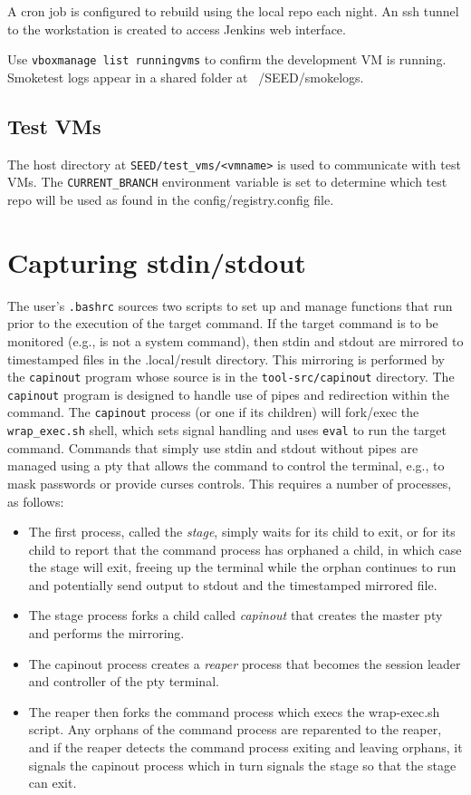 \documentclass[12pt]{article}
\begin{document}
A cron job is configured to rebuild using the local repo each night.
An ssh tunnel to the workstation is created to access Jenkins web interface.

Use {\tt vboxmanage list runningvms} to confirm the development VM is running.
Smoketest logs appear in a shared folder at ~/SEED/smokelogs.

\subsection{Test VMs}
The host directory at {\tt SEED/test\_vms/<vmname>} is used to communicate with test VMs.
The {\tt CURRENT\_BRANCH} environment variable is set to determine which test repo
will be used as found in the config/registry.config file.

\section{Capturing stdin/stdout}
The user's {\tt .bashrc} sources two scripts to set up and manage functions that run prior to the 
execution of the target command.  If the target command is to be monitored (e.g., is not a system command),
then stdin and stdout are mirrored to timestamped files in the .local/result directory.  This mirroring
is performed by the {\tt capinout} program whose source is in the {\tt tool-src/capinout} directory.
The {\tt capinout} program is designed to handle use of pipes and redirection within the command.  The
{\tt capinout} process (or one if its children) will fork/exec the {\tt wrap\_exec.sh} shell, which sets
signal handling and uses {\tt eval} to run the target command. Commands
that simply use stdin and stdout without pipes are managed using a pty that allows the command to control the
terminal, e.g., to mask passwords or provide curses controls.  This requires a number of processes, as follows:
\begin{itemize}
\item The first process, called the \textit{stage}, simply waits for its child to exit, or for its child to report
that the command process has orphaned a child, in which case the stage will exit, freeing up the terminal while the
orphan continues to run and potentially send output to stdout and the timestamped mirrored file.  
\item The stage
process forks a child called \textit{capinout} that creates the master pty and performs the mirroring.  
\item The capinout process creates a \textit{reaper} process that becomes the session leader and controller of the pty terminal.  
\item The reaper then forks the command process which execs the wrap-exec.sh script.  Any orphans of the command process are reparented to the
reaper, and if the reaper detects the command process exiting and leaving orphans, it signals the capinout process which
in turn signals the stage so that the stage can exit.
\end{itemize}

\end{document}
